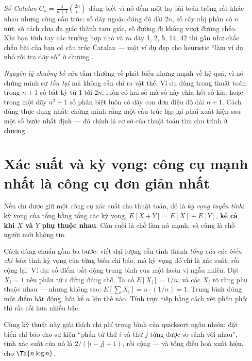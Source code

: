 \documentclass[../../algorithm.tex]{subfiles}
\begin{document}
\emph{Số Catalan} \(C_n = \frac{1}{n+1}\binom{2n}{n}\) đáng biết vì nó đếm một họ bài toán trông rất khác nhau nhưng cùng cấu trúc: số dãy ngoặc đúng độ dài \(2n\), số cây nhị phân có \(n\) nút, số cách chia đa giác thành tam giác, số đường đi không vượt đường chéo. Khi bạn tính tay các trường hợp nhỏ và ra dãy 1, 2, 5, 14, 42 thì gần như chắc chắn bài của bạn có cấu trúc Catalan --- một ví dụ đẹp cho heuristic ``làm ví dụ nhỏ rồi tra dãy số'' ở chương .

\emph{Nguyên lý chuồng bồ câu} tầm thường về phát biểu nhưng mạnh về hệ quả, vì nó chứng minh sự \emph{tồn tại} mà không cần chỉ ra vật thể. Ví dụ dùng trong thuật toán: trong \(n+1\) số bất kỳ từ 1 tới \(2n\), luôn có hai số mà số này chia hết số kia; hoặc trong một dãy \(n^2+1\) số phân biệt luôn có dãy con đơn điệu độ dài \(n+1\). Cách dùng thực dụng nhất: chứng minh rằng một cấu trúc lặp lại phải xuất hiện sau một số bước nhất định --- đó chính là cơ sở của thuật toán tìm chu trình ở chương .

\section{Xác suất và kỳ vọng: công cụ mạnh nhất là công cụ đơn giản nhất}

Nếu chỉ được giữ một công cụ xác suất cho thuật toán, đó là \emph{kỳ vọng tuyến tính}: kỳ vọng của tổng bằng tổng các kỳ vọng, \(E[X+Y] = E[X] + E[Y]\), \textbf{kể cả khi \(X\) và \(Y\) phụ thuộc nhau}. Câu cuối là chỗ làm nó mạnh, và cũng là chỗ người mới không tin.

Cách dùng chuẩn gồm ba bước: viết đại lượng cần tính thành \emph{tổng của các biến chỉ báo}; tính kỳ vọng của từng biến chỉ báo, mà kỳ vọng đó chỉ là xác suất; rồi cộng lại. Ví dụ: số điểm bất động trung bình của một hoán vị ngẫu nhiên. Đặt \(X_i = 1\) nếu phần tử \(i\) đứng đúng chỗ. Ta có \(E[X_i] = 1/n\), và các \(X_i\) rõ ràng phụ thuộc nhau --- nhưng không sao: \(E[\sum X_i] = n \cdot (1/n) = 1\). Trung bình đúng một điểm bất động, bất kể \(n\) lớn thế nào. Tính trực tiếp bằng cách xét phân phối thì rắc rối hơn nhiều bậc.

Cùng kỹ thuật này giải thích chi phí trung bình của quicksort ngẫu nhiên: đặt biến chỉ báo cho sự kiện ``phần tử thứ \(i\) và thứ \(j\) từng được so sánh với nhau'', tính xác suất của nó là \(2/(|i-j|+1)\), rồi cộng --- và tổng điều hoà xuất hiện, cho \(\Th{n\log n}\).
\end{document}

